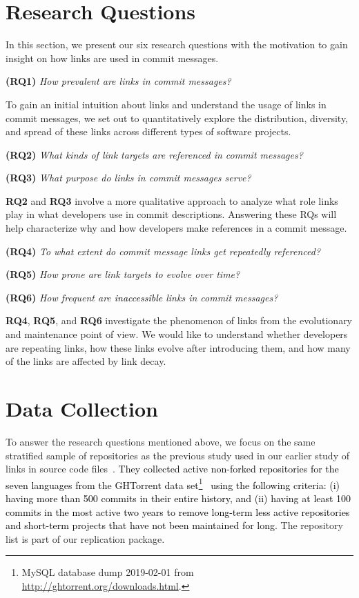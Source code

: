 \documentclass[smallextended]{svjour3}       %
\newcommand{\fix}[1]{\textcolor{black}{#1}}
\newcommand{\minor}[1]{\textcolor{black}{#1}}
\begin{document}

\section{Research Questions}
\label{sec:rq}
In this section, we present our six research questions with the motivation to gain insight on how links are used in commit messages.

\textbf{(RQ1)} \textit{How prevalent are links in commit messages?}

To gain an initial intuition about links and understand the usage of links in commit messages, we set out to quantitatively explore the
distribution, diversity, and spread of these links across different
types of software projects.

\textbf{(RQ2)} \textit{What kinds of link targets are referenced in commit messages?}

\textbf{(RQ3)} \textit{What purpose do links in commit messages serve?}

\textbf{RQ2} and \textbf{RQ3} involve a more qualitative approach to analyze what role links play in what developers use in commit descriptions. Answering these RQs will help characterize why and how developers make references in a commit message.

\textbf{(RQ4)} \textit{To what extent do commit message links get repeatedly referenced?}

\textbf{(RQ5)} \textit{How prone are link targets to evolve over time?}

\textbf{(RQ6)} \textit{How frequent are \minor{inaccessible} links in commit messages?}

\textbf{RQ4}, \textbf{RQ5}, and \textbf{RQ6} investigate the phenomenon of links from the evolutionary and maintenance point of view. We would like to understand whether developers are repeating links, how these links evolve after introducing them, and how many of the links are affected by link decay.


\section{Data Collection}
\label{sec:dc}
To answer the research questions mentioned above, we focus on the same stratified sample of repositories as the previous study used in our earlier study of links in source code files~\citep{hata20199}. \fix{They collected active non-forked repositories for the seven languages from the GHTorrent data set\footnote{MySQL database dump 2019-02-01 from \url{http://ghtorrent.org/downloads.html}.}~\citep{gousios2013ghtorent} using the following
criteria: (i) having more than 500 commits in their entire
history, and
(ii) having at least 100 commits in the most active two
years to remove long-term
less active repositories and short-term projects that have
not been maintained for long.}
The repository list is part of our replication package.%
\end{document}
